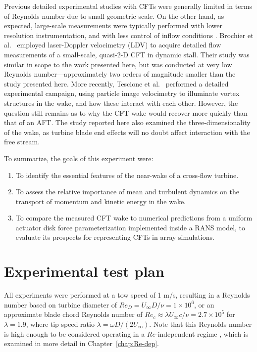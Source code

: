 Previous detailed experimental studies with CFTs were generally limited in terms
of Reynolds number due to small geometric scale. On the other hand, as expected,
large-scale measurements were typically performed with lower resolution
instrumentation, and with less control of inflow conditions
\cite{Vermeulen1979}. Brochier et al.~\cite{Brochier1986} employed laser-Doppler
velocimetry (LDV) to acquire detailed flow measurements of a small-scale,
quasi-2-D CFT in dynamic stall. Their study was similar in scope to the work
presented here, but was conducted at very low Reynolds number---approximately
two orders of magnitude smaller than the study presented here. More recently,
Tescione et al.~\cite{Tescione2014} performed a detailed experimental campaign,
using particle image velocimetry to illuminate vortex structures in the wake,
and how these interact with each other. However, the question still remains as
to why the CFT wake would recover more quickly than that of an AFT. The study
reported here also examined the three-dimensionality of the wake, as turbine
blade end effects will no doubt affect interaction with the free stream.


To summarize, the goals of this experiment were:
\begin{enumerate}
    \item To identify the essential features of the near-wake of a cross-flow
    turbine.

    \item To assess the relative importance of mean and turbulent dynamics on the
    transport of momentum and kinetic energy in the wake.

    \item To compare the measured CFT wake to numerical predictions from a
    uniform actuator disk force parameterization implemented inside a RANS
    model, to evaluate its prospects for representing CFTs in array simulations.
\end{enumerate}


\section{Experimental test plan}

All experiments were performed at a tow speed of 1 m/s, resulting in a Reynolds
number based on turbine diameter of $Re_D = U_\infty D /\nu = 1 \times 10^6$, or
an approximate blade chord Reynolds number of $Re_c \approx \lambda U_\infty
c/\nu = 2.7 \times 10^5$ for $\lambda=1.9$, where tip speed ratio $\lambda
= \omega D / (2 U_\infty)$. Note that this Reynolds number is high enough
to be considered operating in a $Re$-independent regime \cite{Bravo2007,
    Bachant2014, Bachant2016-Energies}, which is examined in more detail in
Chapter~\ref{chap:Re-dep}.

